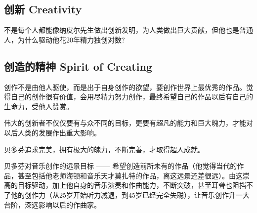 \hypertarget{ux521bux65b0-creativity}{%
\subsection{创新 Creativity}\label{ux521bux65b0-creativity}}

不是每个人都能像纳皮尔先生做出创新发明，为人类做出巨大贡献，但他也是普通人，为什么驱动他花20年精力独创对数?


\hypertarget{ux521bux9020ux7684ux7cbeux795e-spirit-of-creating}{%
\subsection{创造的精神 Spirit of
Creating}\label{ux521bux9020ux7684ux7cbeux795e-spirit-of-creating}}

创作不是由他人驱使，而是出于自身创作的欲望，要创作世界上最优秀的作品。觉得自己的创作很有价值，会用尽精力努力创作，最终希望自己的作品以后有自己的生命力，受他人赞赏。

伟大的创新者不仅仅要有与众不同的目标，更要有超凡的能力和巨大魄力，才能对以后人类的发展作出重大影响。

贝多芬追求完美，拥有极大的魄力，不断完善，才取得超人成就。

贝多芬对音乐创作的远景目标 ------
希望创造前所未有的作品（他觉得当代的作品，甚至包括他老师海顿和音乐天才莫扎特的作品，离这远景还差很远）。由这崇高的目标驱动，加上他自身的音乐演奏和作曲能力，不断突破，甚至耳聋也阻挡不了他的创作力（从25岁开始听力减退，到45岁已经完全失聪），让音乐创作升一大台阶，深远影响以后的作曲家。\\


